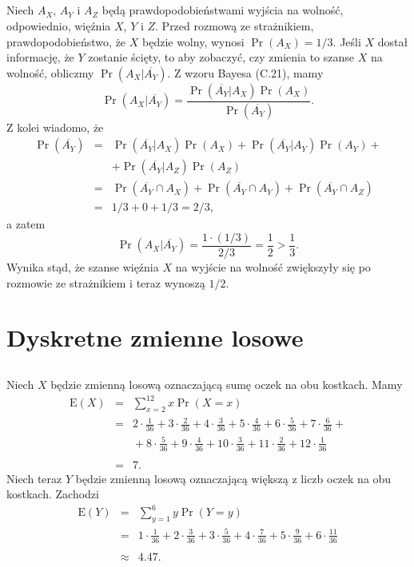 \subsection{} %
Niech $A_X$, $A_Y$ i $A_Z$ będą prawdopodobieństwami wyjścia na wolność, odpowiednio, więźnia $X$, $Y$ i $Z$. Przed rozmową ze strażnikiem, prawdopodobieństwo, że $X$ będzie wolny, wynosi $\Pr\left(A_X\right)=1/3$. Jeśli $X$ dostał informację, że $Y$ zostanie ścięty, to aby zobaczyć, czy zmienia to szanse $X$ na wolność, obliczmy $\Pr\left(A_X|\overline{A_Y}\right)$. Z wzoru Bayesa (C.21), mamy
\[
	\Pr\left(A_X|\overline{A_Y}\right) = \frac{\Pr\left(\overline{A_Y}|A_X\right)\Pr\left(A_X\right)}{\Pr\left(\overline{A_Y}\right)}.
\]
Z kolei wiadomo, że
\begin{eqnarray*}
	\Pr\left(\overline{A_Y}\right) &=& \Pr\left(\overline{A_Y}|A_X\right)\Pr\left(A_X\right)+\Pr\left(\overline{A_Y}|A_Y\right)\Pr\left(A_Y\right)+{} \\
	&& +{}\Pr\left(\overline{A_Y}|A_Z\right)\Pr\left(A_Z\right) \\
	&=& \Pr\left(\overline{A_Y}\cap A_X\right)+\Pr\left(\overline{A_Y}\cap A_Y\right)+\Pr\left(\overline{A_Y}\cap A_Z\right) \\
	&=& 1/3+0+1/3 = 2/3,
\end{eqnarray*}
a zatem
\[
	\Pr\left(A_X|\overline{A_Y}\right) = \frac{1\cdot (1/3)}{2/3} = \frac{1}{2}>\frac{1}{3}.
\]
Wynika stąd, że szanse więźnia $X$ na wyjście na wolność zwiększyły się po rozmowie ze strażnikiem i teraz wynoszą $1/2$.

\section{Dyskretne zmienne losowe}

\subsection{} %
Niech $X$ będzie zmienną losową oznaczającą sumę oczek na obu kostkach. Mamy
\begin{eqnarray*}
	\mathrm{E}(X) &=& \sum_{x=2}^{12}x\Pr(X=x) \\
	&=& 2\cdot\frac{1}{36}+3\cdot\frac{2}{36}+4\cdot\frac{3}{36}+5\cdot\frac{4}{36}+6\cdot\frac{5}{36}+7\cdot\frac{6}{36}+{}\nonumber \\
	&& {}+8\cdot\frac{5}{36}+9\cdot\frac{4}{36}+10\cdot\frac{3}{36}+11\cdot\frac{2}{36}+12\cdot\frac{1}{36} \\\\
	&=& 7.
\end{eqnarray*}
Niech teraz $Y$ będzie zmienną losową oznaczającą większą z liczb oczek na obu kostkach. Zachodzi
\begin{eqnarray*}
	\mathrm{E}(Y) &=& \sum_{y=1}^{6}y\Pr(Y=y) \\
	&=& 1\cdot\frac{1}{36}+2\cdot\frac{3}{36}+3\cdot\frac{5}{36}+4\cdot\frac{7}{36}+5\cdot\frac{9}{36}+6\cdot\frac{11}{36} \\\\
	&\approx& 4.47.
\end{eqnarray*}

